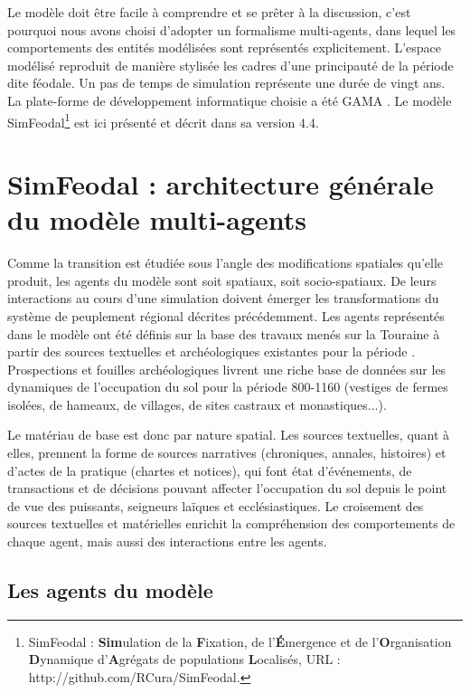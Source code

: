 Le modèle doit être facile à comprendre et se prêter à la discussion, c'est pourquoi nous avons choisi d'adopter un formalisme multi-agents, dans lequel les comportements des entités modélisées sont représentés explicitement.
L'espace modélisé reproduit de manière stylisée les cadres d'une principauté de la période dite féodale.
Un pas de temps de simulation représente une durée de vingt ans.
La plate-forme de développement informatique choisie a été GAMA \autocite{grignard_gama_2013}.
Le modèle SimFeodal\footnote{
SimFeodal : \textbf{Sim}ulation de la \textbf{F}ixation, de l’\textbf{É}mergence et de l’\textbf{O}rganisation \textbf{D}ynamique d’\textbf{A}grégats de populations \textbf{L}ocalisés, URL : http://github.com/RCura/SimFeodal.
} est ici présenté et décrit dans sa version 4.4.

\section[Architecture générale]{SimFeodal : architecture générale du modèle multi-agents}

Comme la transition est étudiée sous l'angle des modifications spatiales qu'elle	produit, les agents du modèle sont soit spatiaux, soit socio-spatiaux.
De leurs interactions au cours d'une simulation doivent émerger les transformations du système de peuplement régional décrites précédemment.
Les agents représentés dans le modèle ont été définis sur la base des travaux menés sur la Touraine à partir des sources textuelles et archéologiques existantes pour la période \autocite{zadora-rio_paroisses_2008}.
Prospections et fouilles archéologiques livrent une riche base de données sur les dynamiques de l'occupation du sol pour la période 800-1160 (vestiges de fermes isolées, de hameaux, de villages, de sites castraux et monastiques...). 

Le matériau de base est donc par nature spatial.
Les sources textuelles, quant à elles, prennent la forme de sources narratives (chroniques, annales, histoires) et d'actes de la pratique (chartes et notices), qui font état d'événements, de transactions et de décisions pouvant affecter l'occupation du sol depuis le point de vue des puissants, seigneurs laïques et ecclésiastiques.
Le croisement des sources textuelles et matérielles enrichit la compréhension des comportements de chaque agent, mais aussi des interactions entre les agents.

\subsection{Les agents du modèle}

